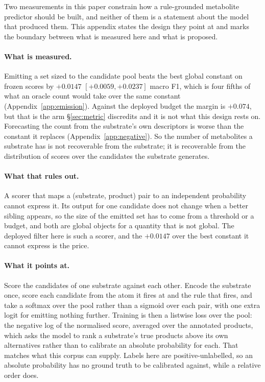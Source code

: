 Two measurements in this paper constrain how a rule-grounded metabolite predictor should be built,
and neither of them is a statement about the model that produced them. This appendix states the
design they point at and marks the boundary between what is measured here and what is proposed.

\paragraph{What is measured.} Emitting a set sized to the candidate pool beats the best global
constant on frozen scores by $+0.0147$ $[+0.0059,+0.0237]$ macro F1, which is four fifths of what an
oracle count would take over the same constant (Appendix~\ref{app:emission}). Against the deployed
budget the margin is $+0.074$, but that is the arm \S\ref{sec:metric} discredits and it is not what
this design rests on. Forecasting the count from the substrate's own descriptors is worse than the
constant it replaces (Appendix~\ref{app:negative}). So the number of metabolites a substrate has is
not recoverable from the substrate; it is recoverable from the distribution of scores over the
candidates the substrate generates.

\paragraph{What that rules out.} A scorer that maps a (substrate, product) pair to an independent
probability cannot express it. Its output for one candidate does not change when a better sibling
appears, so the size of the emitted set has to come from a threshold or a budget, and both are
global objects for a quantity that is not global. The deployed filter here is such a scorer, and the
$+0.0147$ over the best constant it cannot express is the price.

\paragraph{What it points at.} Score the candidates of one substrate against each other. Encode the
substrate once, score each candidate from the atom it fires at and the rule that fires, and take a
softmax over the pool rather than a sigmoid over each pair, with one extra logit for emitting
nothing further. Training is then a listwise loss over the pool: the negative log of the normalised
score, averaged over the annotated products, which asks the model to rank a substrate's true
products above its own alternatives rather than to calibrate an absolute probability for each. That
matches what this corpus can supply. Labels here are positive-unlabelled, so an absolute probability
has no ground truth to be calibrated against, while a relative order does.

